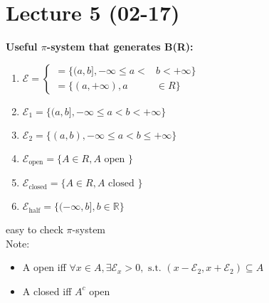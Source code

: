 \section{Lecture 5 (02-17)}
\textbf{Useful $ \pi $-system that generates B(R):}
 \begin{enumerate}[label=\circled{\arabic*}] 
 \item $\mathcal{E}=\begin{cases}
    =\{(a,b],-\infty\leq a<&b<+\infty\}\\
    =\{(a,+\infty), a&\in R\}
 \end{cases}$
 \item $ \mathcal{E}_1=\{(a,b],-\infty\leq a<b<+\infty\} $ 
 \item $ \mathcal{E}_2=\{(a,b),-\infty\leq a<b\leq+\infty\}$ 
 \item $ \mathcal{E}_{\text{open}}=\{A\in R,A \text{ open }\} $
 \item $ \mathcal{E}_{\text{closed}}=\{A\in R,A \text{ closed }\}  $ 
 \item $ \mathcal{E}_{\text{half}}  =\{(-\infty,b],b\in \mathbb{R}\} $
 \end{enumerate}
 easy to check $ \pi $-system
 \\Note: \begin{itemize}
 \item A open iff $ \forall x\in A,\exists \mathcal{E}_x>0, \text{ s.t. } (x-\mathcal{E}_2,x+\mathcal{E}_2)\subseteq A$ 
 \item A closed iff $ A^c $ open
 \end{itemize} 
